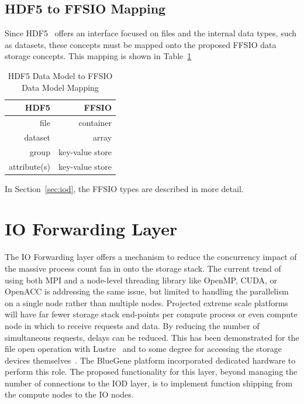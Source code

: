 \documentclass[conference]{IEEEtran} \pdfpagewidth=8.5in
\begin{document}
\subsection{HDF5 to FFSIO Mapping}
\label{sec:hdf-to-ffsio}

Since HDF5~\cite{folk:2011:hdf5} offers an interface focused on files and the internal
data types, such as datasets, these concepts must be mapped onto the proposed
FFSIO data storage concepts.  This mapping is shown in Table~\ref{tab:mapping}

\begin{table}[ht]
    \centering
    \caption[HDF5 to FFSIO Mapping]{HDF5 Data Model to FFSIO Data Model Mapping}
    \bigskip
    \begin{tabular}{|r|r|}
\hline
HDF5 & FFSIO\\
\hline
file & container \\
dataset & array \\
group & key-value store \\
attribute(s) & key-value store \\
\hline
    \end{tabular}
    \label{tab:mapping}
\end{table}

In Section~\ref{sec:iod}, the FFSIO types are described in more detail.

\section{IO Forwarding Layer}
\label{sec:iof}

The IO Forwarding layer offers a mechanism to reduce the concurrency impact of
the massive process count fan in onto the storage stack. The current trend of
using both MPI and a node-level threading library like OpenMP, CUDA, or OpenACC
is addressing the same issue, but limited to handling the parallelism on a
single node rather than multiple nodes. Projected extreme scale platforms will
have far fewer storage stack end-points per compute process or even compute
node in which to receive requests and data. By reducing the number of
simultaneous requests, delays can be reduced. This has been demonstrated for
the file open operation with Lustre~\cite{lofstead:2009:adaptable} and to some
degree for accessing the storage devices
themselves~\cite{lofstead:2010:io-variability}.  The BlueGene platform
incorporated dedicated hardware to perform this role. The proposed
functionality for this layer, beyond managing the number of connections to the
IOD layer, is to implement function shipping from the compute nodes to the IO
nodes.
\end{document}
